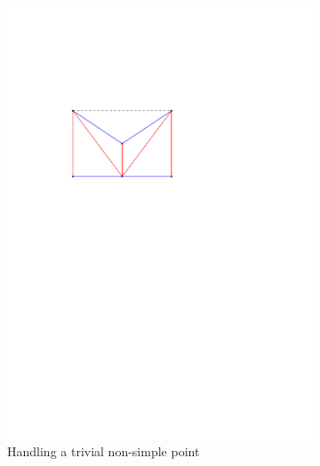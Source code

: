 \documentclass[a4paper]{article}
\theoremstyle{definition}
\begin{document}
\begin{figure}
    \centering
    \begin{subfigure}[b]{0.45\textwidth}
    \includegraphics[scale=0.8]{img/shortWalk}
        \caption{Handling a trivial non-simple point}
    \end{subfigure}
    \quad
    \begin{subfigure}[b]{0.45\textwidth}

\end{subfigure}
\end{figure}
\end{document}

